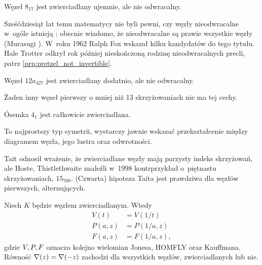 \begin{example}
    Węzeł $8_{17}$ jest zwierciadlany ujemnie, ale nie odwracalny.
\end{example}

Sześćdziesiąt lat temu matematycy nie byli pewni, czy węzły nieodwracalne w~ogóle istnieją \cite[problem 10]{fox62};
obecnie wiadomo, że nieodwracalne są prawie wszystkie węzły (Murasugi \cite[s.~46]{murasugi96}).
%
W~roku 1962 Ralph Fox wskazał kilku kandydatów do tego tytułu.
%
Hale Trotter odkrył rok później nieskończoną rodzinę nieodwracalnych precli, patrz \ref{prp:pretzel_not_invertible}.
%


\begin{example}
    Węzeł $12a_{427}$ jest zwierciadlany dodatnio, ale nie odwracalny.
\end{example}

Żaden inny węzeł pierwszy o mniej niż 13 skrzyżowaniach nie ma tej cechy.

\begin{example}
\label{property_of_eight_knot}%
    Ósemka $4_1$ jest całkowicie zwierciadlana.
\end{example}

To najprostszy typ symetrii, wystarczy jawnie wskazać przekształcenie między diagramem węzła, jego lustra oraz odwrotności.

Tait odnosił wrażenie, że zwierciadlane węzły mają parzysty indeks skrzyżowań, ale Hoste, Thistlethwaite znaleźli w~1998 kontrprzykład o~piętnastu skrzyżowaniach, $15_{700}$. %
(Czwarta) hipoteza Taita jest prawdziwa dla węzłów pierwszych, alternujących.

\begin{proposition}
    Niech $K$ będzie węzłem zwierciadlanym.
    Wtedy
    \begin{align}
        V(t) & = V(1/t) \\
        P(a, z) & = P(1/a, z) \\
        F(a, z) & = F(1/a, z),
    \end{align}
    gdzie $V, P, F$ oznacza kolejno wielomian Jonesa, HOMFLY oraz Kauffmana.
    Równość $\nabla(z) = \nabla(-z)$ zachodzi dla wszystkich węzłów, zwierciadlanych lub nie.
\end{proposition}

